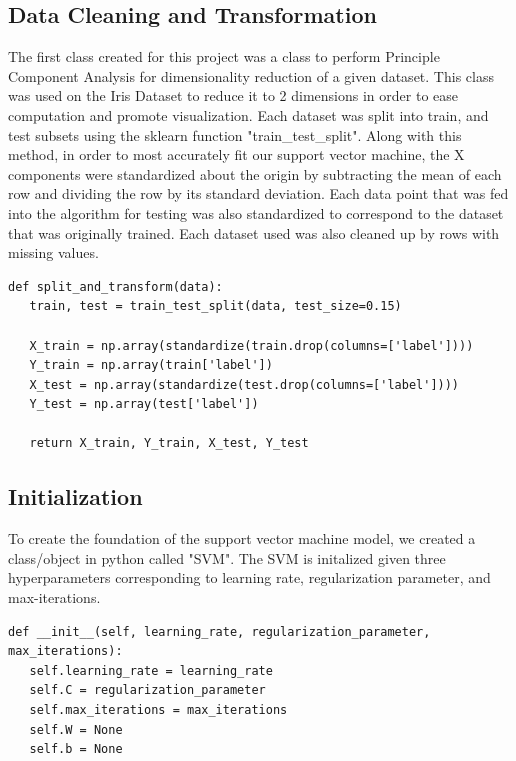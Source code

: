 \documentclass[12pt]{article}%
\begin{document}
	\subsection{Data Cleaning and Transformation}
	The first class created for this project was a class to perform Principle Component Analysis for dimensionality reduction of a given dataset.  This class was used on the Iris Dataset to reduce it to 2 dimensions in order to ease computation and promote visualization.  Each dataset was split into train, and test subsets using the sklearn function "train\_test\_split".  Along with this method, in order to most accurately fit our support vector machine, the X components were standardized about the origin by subtracting the mean of each row and dividing the row by its standard deviation.  Each data point that was fed into the algorithm for testing was also standardized to correspond to the dataset that was originally trained.  Each dataset used was also cleaned up by rows with missing values.
\begin{verbatim}
def split_and_transform(data):
   train, test = train_test_split(data, test_size=0.15)
	
   X_train = np.array(standardize(train.drop(columns=['label'])))
   Y_train = np.array(train['label'])
   X_test = np.array(standardize(test.drop(columns=['label'])))
   Y_test = np.array(test['label'])
	
   return X_train, Y_train, X_test, Y_test
\end{verbatim}
	\subsection{Initialization}
	To create the foundation of the support vector machine model, we created a class/object in python called "SVM".  The SVM is initalized given three hyperparameters corresponding to learning rate, regularization parameter, and max-iterations.
\begin{verbatim}
def __init__(self, learning_rate, regularization_parameter, max_iterations):
   self.learning_rate = learning_rate
   self.C = regularization_parameter
   self.max_iterations = max_iterations
   self.W = None
   self.b = None
\end{verbatim}
\end{document}
